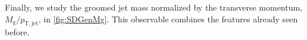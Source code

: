 Finally, we study the groomed jet mass normalized by the transverse momentum, $M_{\mathrm{g}}/p_{\mathrm{T,jet}}$, in \autoref{fig:SDGenMg}. This observable combines the features already seen before.


